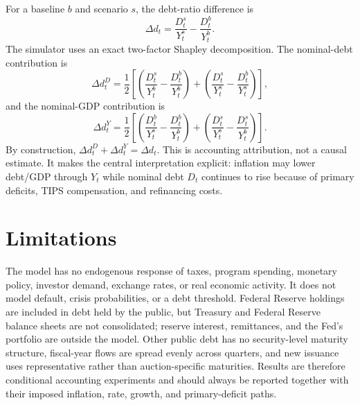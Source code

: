 \documentclass[10pt]{article}
\begin{document}
For a baseline $b$ and scenario $s$, the debt-ratio difference is
\begin{equation}
 \Delta d_t=\frac{D^s_t}{Y^s_t}-\frac{D^b_t}{Y^b_t}.
\end{equation}
The simulator uses an exact two-factor Shapley decomposition.  The nominal-debt contribution
is
\begin{equation}
 \Delta d_t^D=\frac{1}{2}\left[
 \left(\frac{D^s_t}{Y^b_t}-\frac{D^b_t}{Y^b_t}\right)
 +\left(\frac{D^s_t}{Y^s_t}-\frac{D^b_t}{Y^s_t}\right)\right],
\end{equation}
and the nominal-GDP contribution is
\begin{equation}
 \Delta d_t^Y=\frac{1}{2}\left[
 \left(\frac{D^b_t}{Y^s_t}-\frac{D^b_t}{Y^b_t}\right)
 +\left(\frac{D^s_t}{Y^s_t}-\frac{D^s_t}{Y^b_t}\right)\right].
\end{equation}
By construction, $\Delta d_t^D+\Delta d_t^Y=\Delta d_t$.  This is accounting attribution,
not a causal estimate.  It makes the central interpretation explicit: inflation may lower
debt/GDP through $Y_t$ while nominal debt $D_t$ continues to rise because of primary
deficits, TIPS compensation, and refinancing costs.

\section{Limitations}

The model has no endogenous response of taxes, program spending, monetary policy, investor
demand, exchange rates, or real economic activity.  It does not model default, crisis
probabilities, or a debt threshold.  Federal Reserve holdings are included in debt held by
the public, but Treasury and Federal Reserve balance sheets are not consolidated; reserve
interest, remittances, and the Fed's portfolio are outside the model.  Other public debt has
no security-level maturity structure, fiscal-year flows are spread evenly across quarters,
and new issuance uses representative rather than auction-specific maturities.  Results are
therefore conditional accounting experiments and should always be reported together with
their imposed inflation, rate, growth, and primary-deficit paths.
\end{document}
